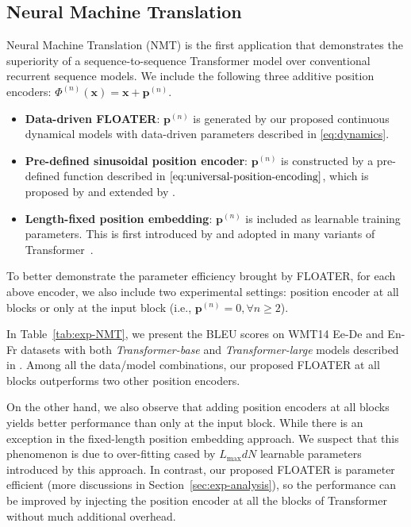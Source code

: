 \documentclass[11pt]{article}
\def\vp{{\bm{p}}}
\def\vx{{\bm{x}}}
\begin{document}
\subsection{Neural Machine Translation}
\label{sec:exp-nmt}
Neural Machine Translation (NMT) is the first application that demonstrates the superiority of a sequence-to-sequence Transformer model over conventional recurrent sequence models. 
We include the following three additive position encoders: $\Phi^{(n)}(\vx) = \vx + \vp^{(n)}$.
\begin{itemize}[nosep,leftmargin=1em,labelwidth=*,align=left]
\item \textbf{Data-driven FLOATER}: $\vp^{(n)}$ is generated by our proposed continuous dynamical models with data-driven parameters described in \eqref{eq:dynamics}. 
\item \textbf{Pre-defined sinusoidal position encoder}: $\vp^{(n)}$ is constructed by a pre-defined function described in $\eqref{eq:universal-position-encoding}$, which is proposed by \cite{vaswani2017attention} and extended by \cite{dehghani2018universal}.  
\item \textbf{Length-fixed position embedding}: $\vp^{(n)}$ is included as learnable training parameters. This is first introduced by \cite{vaswani2017attention} and adopted in many variants of Transformer~\cite{devlin2018bert,liu2019roberta}. 
\end{itemize}
To better demonstrate the parameter efficiency brought by FLOATER, for each above encoder, we also include two experimental settings: position encoder at all blocks or only at the input block (i.e., $\vp^{(n)} = 0, \forall n \ge 2$).

In Table~\ref{tab:exp-NMT}, we present the BLEU scores on WMT14 Ee-De and En-Fr datasets with both \textit{Transformer-base} and \textit{Transformer-large} models described in \cite{vaswani2017attention}.
Among all the data/model combinations, our proposed FLOATER at all blocks outperforms two other position encoders. 

On the other hand, we also observe that adding position encoders at all blocks yields better performance than only at the input block. While there is an exception in the fixed-length position embedding approach. We suspect that this phenomenon is due to over-fitting cased by $L_{\text{max}}dN$ learnable parameters introduced by this approach. In contrast, our proposed FLOATER is parameter efficient (more discussions in Section~\ref{sec:exp-analysis}), so the performance can be improved by injecting the position encoder at all the blocks of Transformer without much additional overhead. 
\end{document}
